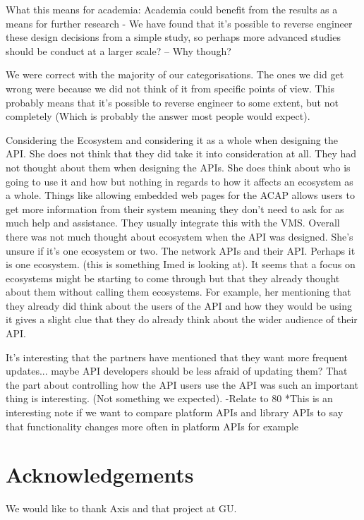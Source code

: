 \documentclass{sig-alternate}
\begin{document}
       What this means for academia:
              Academia could benefit from the results as a means for further research - We have found that it's possible to reverse engineer these design decisions from a simple study, so perhaps more advanced studies should be conduct at a larger scale? -- Why though?


We were correct with the majority of our categorisations. The ones we did get wrong were because we did not think of it from specific points of view. This probably means that it's possible to reverse engineer to some extent, but not completely (Which is probably the answer most people would expect).

Considering the Ecosystem and considering it as a whole when designing the API. She does not think that they did take it into consideration at all. They had not thought about them when designing the APIs. She does think about who is going to use it and how but nothing in regards to how it affects an ecosystem as a whole. Things like allowing embedded web pages for the ACAP allows users to get more information from their system meaning they don’t need to ask for as much help and assistance. They usually integrate this with the VMS. Overall there was not much thought about ecosystem when the API was designed. She’s unsure if it’s one ecosystem or two. The network APIs and their API. Perhaps it is one ecosystem. (this is something Imed is looking at).
It seems that a focus on ecosystems might be starting to come through but that they already thought about them without calling them ecosystems. For example, her mentioning that they already did think about the users of the API and how they would be using it gives a slight clue that they do already think about the wider audience of their API.



It's interesting that the partners have mentioned that they want more frequent updates... maybe API developers should be less afraid of updating them? 
That the part about controlling how the API users use the API was such an important thing is interesting. (Not something we expected). 
-Relate to 80%
*This is an interesting note if we want to compare platform APIs and library APIs to say that functionality changes more often in platform APIs for example




\section{Acknowledgements}
We would like to thank Axis and that project at GU. 


 
\end{document}
